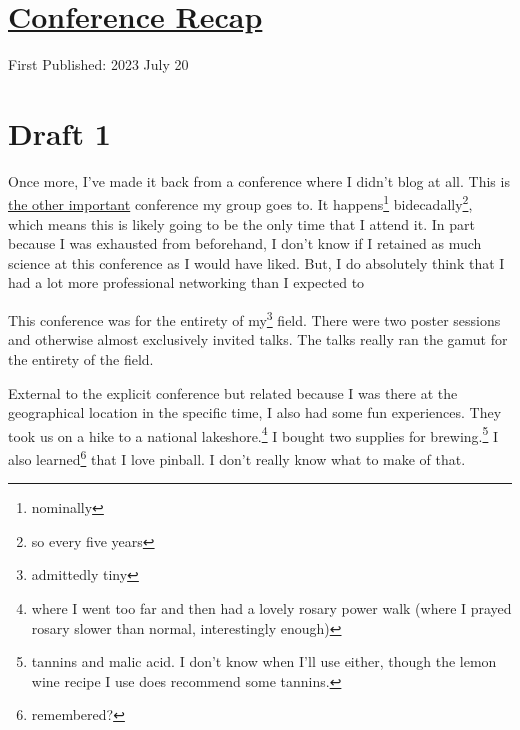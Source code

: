 \documentclass[12pt]{article}[titlepage]
\newcommand{\1}{\={a}}
\newcommand{\2}{\={e}}
\newcommand{\3}{\={\i}}
\newcommand{\4}{\=o}
\newcommand{\5}{\=u}
\newcommand{\6}{\={A}}
\renewcommand{\,}{\textsuperscript{,}}
\begin{document}
\doublespacing
\section{\href{conference-2.html}{Conference Recap}}
First Published: 2023 July 20
\section{Draft 1}
Once more, I've made it back from a conference where I didn't blog at all.
This is \href{conference.html}{the other important} conference my group goes to.
It happens\footnote{nominally} bidecadally\footnote{so every five years}, which means this is likely going to be the only time that I attend it.
In part because I was exhausted from beforehand, I don't know if I retained as much science at this conference as I would have liked.
But, I do absolutely think that I had a lot more professional networking than I expected to

This conference was for the entirety of my\footnote{admittedly tiny} field.
There were two poster sessions and otherwise almost exclusively invited talks.
The talks really ran the gamut for the entirety of the field.

External to the explicit conference but related because I was there at the geographical location in the specific time, I also had some fun experiences.
They took us on a hike to a national lakeshore.\footnote{where I went too far and then had a lovely rosary power walk (where I prayed rosary slower than normal, interestingly enough)}
I bought two supplies for brewing.\footnote{tannins and malic acid.
I don't know when I'll use either, though the lemon wine recipe I use does recommend some tannins.}
I also learned\footnote{remembered?} that I love pinball.
I don't really know what to make of that.
\end{document}
